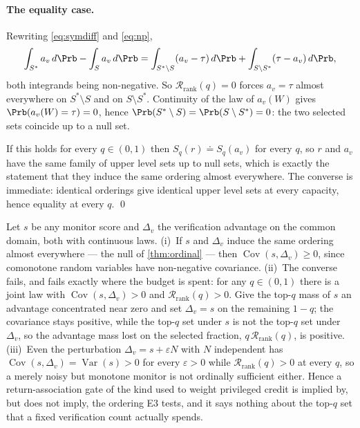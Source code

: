 \paragraph{The equality case.}
Rewriting \eqref{eq:symdiff} and \eqref{eq:np},
\begin{equation}
 \int_{S^*}a_v\,d\Prb-\int_{S}a_v\,d\Prb
 =\int_{S^*\setminus S}(a_v-\tau)\,d\Prb+\int_{S\setminus S^*}(\tau-a_v)\,d\Prb,
\end{equation}
both integrands being non-negative.  So $\mathcal R_{\mathrm{rank}}(q)=0$ forces
$a_v=\tau$ almost everywhere on $S^*\setminus S$ and on $S\setminus S^*$.
Continuity of the law of $a_v(W)$ gives $\Prb(a_v(W)=\tau)=0$, hence
$\Prb(S^*\setminus S)=\Prb(S\setminus S^*)=0$: the two selected sets coincide up
to a null set.

If this holds for every $q\in(0,1)$ then $S_q(r)\doteq S_q(a_v)$ for every $q$,
so $r$ and $a_v$ have the same family of upper level sets up to null sets, which
is exactly the statement that they induce the same ordering almost everywhere.
The converse is immediate: identical orderings give identical upper level sets
at every capacity, hence equality at every $q$. \qed

\begin{remark}
\label{rem:association}
Let $s$ be any monitor score and $\Delta_v$ the verification advantage on the
common domain, both with continuous laws.  (i)~If $s$ and $\Delta_v$ induce the
same ordering almost everywhere --- the null of \cref{thm:ordinal} --- then
$\operatorname{Cov}(s,\Delta_v)\ge0$, since comonotone random variables have
non-negative covariance.  (ii)~The converse fails, and fails exactly where the
budget is spent: for any $q\in(0,1)$ there is a joint law with
$\operatorname{Cov}(s,\Delta_v)>0$ and $\mathcal R_{\mathrm{rank}}(q)>0$.  Give
the top-$q$ mass of $s$ an advantage concentrated near zero and set
$\Delta_v=s$ on the remaining $1-q$; the covariance stays positive, while the
top-$q$ set under $s$ is not the top-$q$ set under $\Delta_v$, so the advantage
mass lost on the selected fraction, $q\,\mathcal R_{\mathrm{rank}}(q)$, is
positive.  (iii)~Even the perturbation $\Delta_v=s+\varepsilon N$ with $N$
independent has $\operatorname{Cov}(s,\Delta_v)=\operatorname{Var}(s)>0$ for
every $\varepsilon>0$ while $\mathcal R_{\mathrm{rank}}(q)>0$ at every $q$, so a
merely noisy but monotone monitor is not ordinally sufficient either.  Hence a
return-association gate of the kind used to weight privileged credit
\citep[Prop.~1]{adrs2026} is implied by, but does not imply, the ordering E3
tests, and it says nothing about the top-$q$ set that a fixed verification count
actually spends.
\end{remark}

